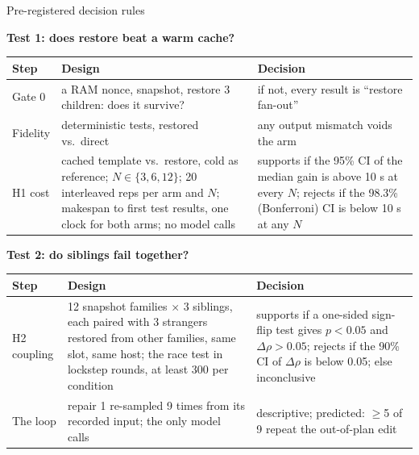 \begin{frame}[t]{\ev{\tagP}Pre-registered decision rules}
\vspace{-.15cm}
{\footnotesize\textbf{Test 1: does restore beat a warm cache?}\par}\vspace{1.5pt}
{\fontsize{7.4}{8.9}\selectfont\renewcommand{\arraystretch}{1.0}
\begin{tabularx}{\textwidth}{@{}L{1.9cm} Y L{5.6cm}@{}}
\toprule
Step & Design & Decision\\
\midrule
Gate 0 & a RAM nonce, snapshot, restore 3 children: does it survive? & if not, every result is ``restore fan-out''\\
Fidelity & deterministic tests, restored vs.\ direct & any output mismatch voids the arm\\
H1 cost & cached template vs.\ restore, cold as reference; $N\in\{3,6,12\}$; 20 interleaved reps per arm and $N$; makespan to first test results, one clock for both arms; no model calls & supports if the 95\% CI of the median gain is above 10 s at every $N$; rejects if the 98.3\% (Bonferroni) CI is below 10 s at any $N$\\
\bottomrule
\end{tabularx}\par}
\vspace{.05cm}
{\footnotesize\textbf{Test 2: do siblings fail together?}\par}\vspace{1.5pt}
{\fontsize{7.4}{8.9}\selectfont\renewcommand{\arraystretch}{1.0}
\begin{tabularx}{\textwidth}{@{}L{1.9cm} Y L{5.6cm}@{}}
\toprule
Step & Design & Decision\\
\midrule
H2 coupling & 12 snapshot families $\times$ 3 siblings, each paired with 3 strangers restored from other families, same slot, same host; the race test in lockstep rounds, at least 300 per condition & supports if a one-sided sign-flip test gives $p<0.05$ and $\Delta\rho>0.05$; rejects if the 90\% CI of $\Delta\rho$ is below 0.05; else inconclusive\\
The loop & repair 1 re-sampled 9 times from its recorded input; the only model calls & descriptive; predicted: $\geq$5 of 9 repeat the out-of-plan edit\\
\bottomrule
\end{tabularx}\par}
\end{frame}
